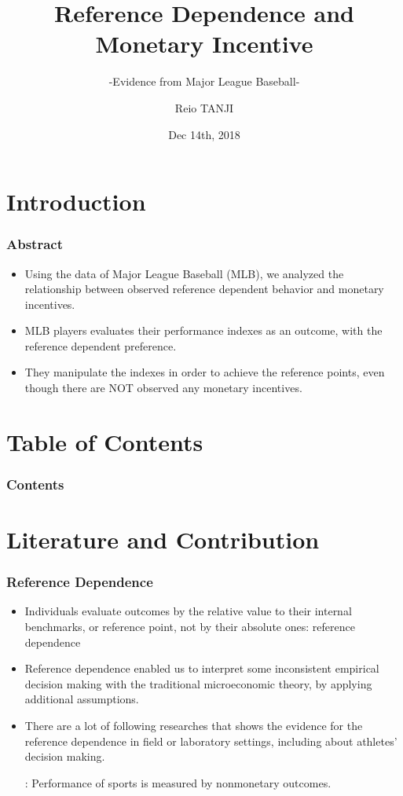 \documentclass[dvipdfmx,12pt]{beamer}
\title{Reference Dependence and Monetary Incentive}
\subtitle{-Evidence from Major League Baseball-}
\author{Reio TANJI}
\date{Dec 14th, 2018}
\institute{Osaka University}
\begin{document}
\begin{frame}\frametitle{}
\titlepage
\end{frame}

\section{Introduction}

\begin{frame}\frametitle{Abstract}
  \begin{itemize}

    \item Using the data of Major League Baseball (MLB), we analyzed the relationship between observed reference dependent behavior and monetary incentives.

    \item MLB players evaluates their performance indexes as an outcome, with the reference dependent preference.

    \item They manipulate the indexes in order to achieve the reference points, even though there are NOT observed any monetary incentives.
  \end{itemize}
\end{frame}

\section*{Table of Contents}
\begin{frame}\frametitle{Contents}
  \tableofcontents
\end{frame}

\section{Literature and Contribution}
\begin{frame}\frametitle{Reference Dependence}
  \begin{itemize}
    \item Individuals evaluate outcomes by the relative value to their internal benchmarks, or reference point, not by their absolute ones: reference dependence

    \item Reference dependence enabled us to interpret some inconsistent empirical decision making with the traditional microeconomic theory, by applying additional assumptions.

    \item There are a lot of following researches that shows the evidence for the reference dependence in field or laboratory settings, including about athletes' decision making.

    : Performance of sports is measured by nonmonetary outcomes.

  \end{itemize}
\end{frame}
\end{document}
